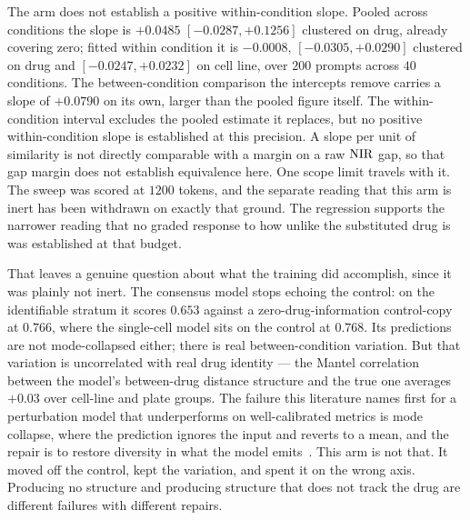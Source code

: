 The arm does not establish a positive within-condition slope. Pooled across conditions the slope is $+0.0485$
$[-0.0287, +0.1256]$ clustered on drug, already covering zero; fitted within
condition it is $-0.0008$, $[-0.0305, +0.0290]$ clustered on drug and
$[-0.0247, +0.0232]$ on cell line, over $200$ prompts across $40$ conditions.
The between-condition comparison the intercepts remove carries a slope of
$+0.0790$ on its own, larger than the pooled figure itself. The within-condition
interval excludes the pooled estimate it replaces, but no positive
within-condition slope is established at this precision. A slope per unit of
similarity is not directly comparable with a margin on a raw $\textrm{NIR}$ gap, so
that gap margin does not establish equivalence here. One scope limit travels with it.
The sweep was scored at $1200$ tokens, and the separate reading that this arm is
inert has been withdrawn on exactly that ground.
The regression supports the narrower reading that no graded response to how
unlike the substituted drug is was established at that budget.

That leaves a genuine question about what the training did accomplish, since it
was plainly not inert. The consensus model stops echoing the control: on the
identifiable stratum it scores $0.653$ against a zero-drug-information
control-copy at $0.766$, where the single-cell model sits on the control at
$0.768$. Its predictions are not mode-collapsed either; there is real
between-condition variation. But that variation is uncorrelated with real drug
identity --- the Mantel correlation between the model's between-drug distance
structure and the true one averages $+0.03$ over cell-line and plate groups. The
failure this literature names first for a perturbation model that underperforms
on well-calibrated metrics is mode collapse, where the prediction ignores the
input and reverts to a mean, and the repair is to restore diversity in what the
model emits~\cite{mejia}. This arm is not that. It moved off the control, kept
the variation, and spent it on the wrong axis. Producing no structure and
producing structure that does not track the drug are different failures with
different repairs.
